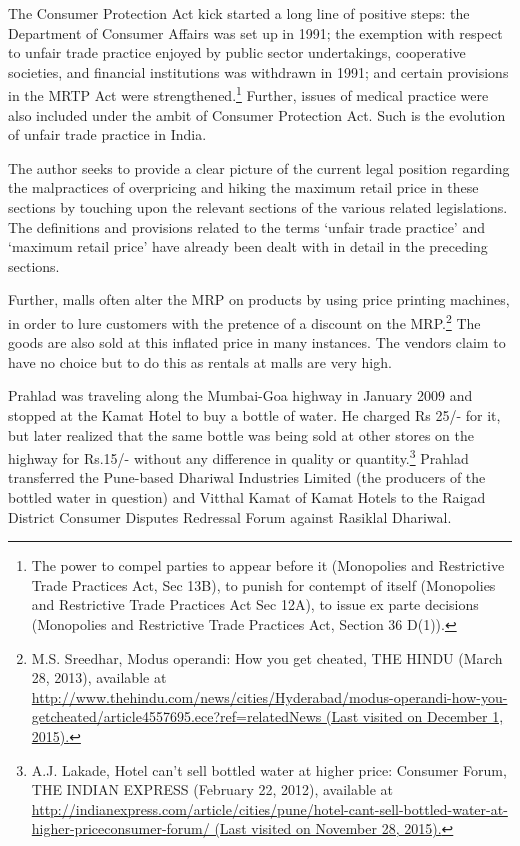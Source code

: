 \begin{multicols}{2}
\noi
The Consumer Protection Act kick started a long line of positive steps: the Department of
Consumer Affairs was set up in 1991; the exemption with respect to unfair trade practice
enjoyed by public sector undertakings, cooperative societies, and financial institutions was
withdrawn in 1991; and certain provisions in the MRTP Act were strengthened.\footnote{The power to compel parties to appear before it (Monopolies and Restrictive Trade Practices Act, Sec 13B),
to punish for contempt of itself (Monopolies and Restrictive Trade Practices Act Sec 12A), to issue ex parte decisions (Monopolies and Restrictive Trade Practices Act, Section 36 D(1)).} Further, issues of medical practice were also included under the ambit of Consumer Protection Act.
Such is the evolution of unfair trade practice in India.


\noi
The author seeks to provide a clear picture of the current legal position regarding the
malpractices of overpricing and hiking the maximum retail price in these sections by touching
upon the relevant sections of the various related legislations. The definitions and provisions
related to the terms ‘unfair trade practice’ and ‘maximum retail price’ have already been dealt
with in detail in the preceding sections.

\noi
Further, malls often alter the MRP on products by using price printing machines, in order to
lure customers with the pretence of a discount on the MRP.\footnote{M.S. Sreedhar, Modus operandi: How you get cheated, THE HINDU (March 28, 2013), available at  \url{http://www.thehindu.com/news/cities/Hyderabad/modus-operandi-how-you-getcheated/article4557695.ece?ref=relatedNews (Last visited on December 1, 2015).}} The goods are also sold at this
inflated price in many instances. The vendors claim to have no choice but to do this as rentals
at malls are very high.

\noi
Prahlad was traveling along the Mumbai-Goa highway in January 2009 and stopped at the
Kamat Hotel to buy a bottle of water. He charged Rs 25/- for it, but later realized that the same
bottle was being sold at other stores on the highway for Rs.15/- without any difference in
quality or quantity.\footnote{ A.J. Lakade, Hotel can’t sell bottled water at higher price: Consumer Forum, THE INDIAN EXPRESS (February 22, 2012), available at \url{http://indianexpress.com/article/cities/pune/hotel-cant-sell-bottled-water-at-higher-priceconsumer-forum/ (Last visited on November 28, 2015).}} Prahlad transferred the Pune-based Dhariwal Industries Limited (the producers of the bottled water in question) and Vitthal Kamat of Kamat Hotels to the Raigad
District Consumer Disputes Redressal Forum against Rasiklal Dhariwal.


\end{multicols}
